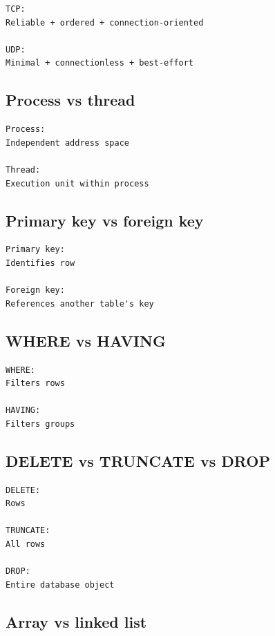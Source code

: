 \begin{lstlisting}
TCP:
Reliable + ordered + connection-oriented

UDP:
Minimal + connectionless + best-effort
\end{lstlisting}

\medskip

\subsection{Process vs thread}

\begin{lstlisting}
Process:
Independent address space

Thread:
Execution unit within process
\end{lstlisting}

\medskip

\subsection{Primary key vs foreign key}

\begin{lstlisting}
Primary key:
Identifies row

Foreign key:
References another table's key
\end{lstlisting}

\medskip

\subsection{WHERE vs HAVING}

\begin{lstlisting}
WHERE:
Filters rows

HAVING:
Filters groups
\end{lstlisting}

\medskip

\subsection{DELETE vs TRUNCATE vs DROP}

\begin{lstlisting}
DELETE:
Rows

TRUNCATE:
All rows

DROP:
Entire database object
\end{lstlisting}

\medskip

\subsection{Array vs linked list}

